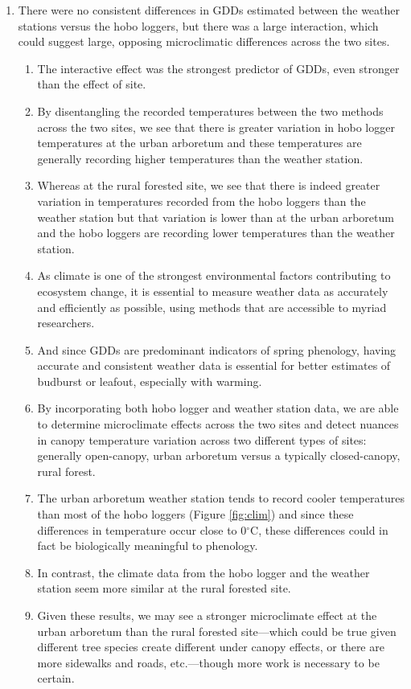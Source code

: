 \documentclass{article}\usepackage[]{graphicx}\usepackage[]{color}
\begin{document}
\begin{enumerate}
\item There were no consistent differences in GDDs estimated between the weather stations versus the hobo loggers, but there was a large interaction, which could suggest large, opposing microclimatic differences across the two sites.
  \begin{enumerate} 
  \item The interactive effect was the strongest predictor of GDDs, even stronger than the effect of site.
  \item By disentangling the recorded temperatures between the two methods across the two sites, we see that there is greater variation in hobo logger temperatures at the urban arboretum and these temperatures are generally recording higher temperatures than the weather station.
  \item Whereas at the rural forested site, we see that there is indeed greater variation in temperatures recorded from the hobo loggers than the weather station but that variation is lower than at the urban arboretum and the hobo loggers are recording lower temperatures than the weather station.
  \item As climate is one of the strongest environmental factors contributing to ecosystem change, it is essential to measure weather data as accurately and efficiently as possible, using methods that are accessible to myriad researchers.
  \item And since GDDs are predominant indicators of spring phenology, having accurate and consistent weather data is essential for better estimates of budburst or leafout, especially with warming.
  \item By incorporating both hobo logger and weather station data, we are able to determine microclimate effects across the two sites and detect nuances in canopy temperature variation across two different types of sites: generally open-canopy, urban arboretum versus a typically closed-canopy, rural forest.
  \item The urban arboretum weather station tends to record cooler temperatures than most of the hobo loggers (Figure \ref{fig:clim}) and since these differences in temperature occur close to 0$^{\circ}$C, these differences could in fact be biologically meaningful to phenology. 
  \item In contrast, the climate data from the hobo logger and the weather station seem more similar at the rural forested site.
  \item Given these results, we may see a stronger microclimate effect at the urban arboretum than the rural forested site---which could be true given different tree species create different under canopy effects, or there are more sidewalks and roads, etc.---though more work is necessary to be certain.
  \end{enumerate}
\end{enumerate}
\end{document}
